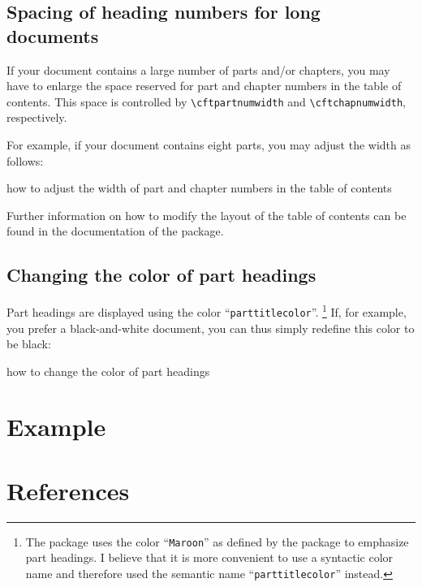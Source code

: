 \subsection{Spacing of heading numbers for long documents}

If your document contains a large number of parts and/or chapters, you may have to enlarge the space reserved for part and chapter numbers in the table of contents. This space is controlled by \lstinline|\cftpartnumwidth| and \lstinline|\cftchapnumwidth|, respectively.

For example, if your document contains eight parts, you may adjust the width as follows:

\begin{texcode}{how to adjust the width of part and chapter numbers in the table of contents}
\settowidth{\cftpartnumwidth}{\cftpartpagefont VIII}
\setlength{\cftchapnumwidth}{\cftpartnumwidth}
\end{texcode}

Further information on how to modify the layout of the table of contents can be found in the documentation of the  package.

\subsection{Changing the color of part headings}

Part headings are displayed using the color \enquote{\texttt{parttitlecolor}}.%
\footnote{The  package uses the color \enquote{\texttt{Maroon}} as defined by the  package to emphasize part headings. I believe that it is more convenient to use a syntactic color name and therefore used the semantic name \enquote{\texttt{parttitlecolor}} instead.} %
If, for example, you prefer a black-and-white document, you can thus simply redefine this color to be black:
\begin{texcode}{how to change the color of part headings}
\end{texcode}


\section{Example}


\printindex


\section*{References}
